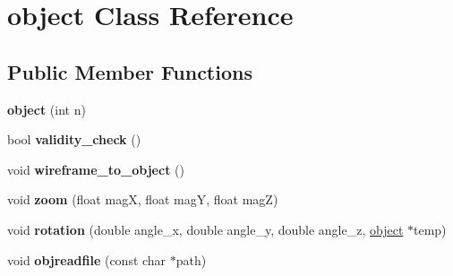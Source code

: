 \hypertarget{classobject}{}\section{object Class Reference}
\label{classobject}
\subsection*{Public Member Functions}
\begin{DoxyCompactItemize}
\item 
\mbox{\label{classobject_a630ee981506bfd85728b34569c16a83a}} 
{\bfseries object} (int n)
\item 
\mbox{\label{classobject_aa94fc0997cda2a08d72d3f47e3d2511f}} 
bool {\bfseries validity\+\_\+check} ()
\item 
\mbox{\label{classobject_a8488b296d2e68c95eebae298457830fb}} 
void {\bfseries wireframe\+\_\+to\+\_\+object} ()
\item 
\mbox{\label{classobject_a9f738846caf4d0e000584005dac58203}} 
void {\bfseries zoom} (float magX, float magY, float magZ)
\item 
\mbox{\label{classobject_a82b10545923b7ca65d22828ab65d8bce}} 
void {\bfseries rotation} (double angle\+\_\+x, double angle\+\_\+y, double angle\+\_\+z, \mbox{\hyperlink{classobject}{object}} $\ast$temp)
\item 
\mbox{\label{classobject_a4870d7088fc9b428802eac708c2da35e}} 
void {\bfseries objreadfile} (const char $\ast$path)
\end{DoxyCompactItemize}
